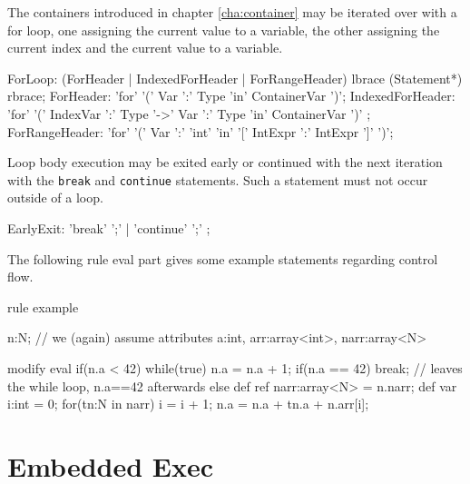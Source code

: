 
The containers introduced in chapter \ref{cha:container} may be iterated over with a for loop, one assigning the current value to a variable, the other assigning the current index and the current value to a variable.
\begin{rail}
  ForLoop: (ForHeader | IndexedForHeader | ForRangeHeader) lbrace (Statement*) rbrace;
  ForHeader: 'for' '(' Var ':' Type 'in' ContainerVar ')';
  IndexedForHeader: 'for' '(' IndexVar ':' Type '->' Var ':' Type 'in' ContainerVar ')' ;
  ForRangeHeader: 'for' '(' Var ':' 'int' 'in' '[' IntExpr ':' IntExpr ']' ')';
\end{rail}

Loop body execution may be exited early or continued with the next iteration with the \texttt{break} and \texttt{continue} statements. Such a statement must not occur outside of a loop.

\begin{rail} 
  EarlyExit: 
	'break' ';' |	'continue' ';'
	;
\end{rail}

\begin{example}
The following rule eval part gives some example statements regarding control flow.
  \begin{grgen}
rule example
{
  n:N; // we (again) assume attributes a:int, arr:array<int>, narr:array<N>
	
	modify {
		eval {
			if(n.a < 42) {
				while(true) {
					n.a = n.a + 1;
					if(n.a == 42) {
						break; // leaves the while loop, n.a==42 afterwards
					}
				}
			} else {
				def ref narr:array<N> = n.narr;
				def var i:int = 0;
				for(tn:N in narr) {
					i = i + 1;
					n.a = n.a + tn.a + n.arr[i];
				}
			}
		}
	}
}
  \end{grgen}
\end{example}


\section{Embedded Exec} 

